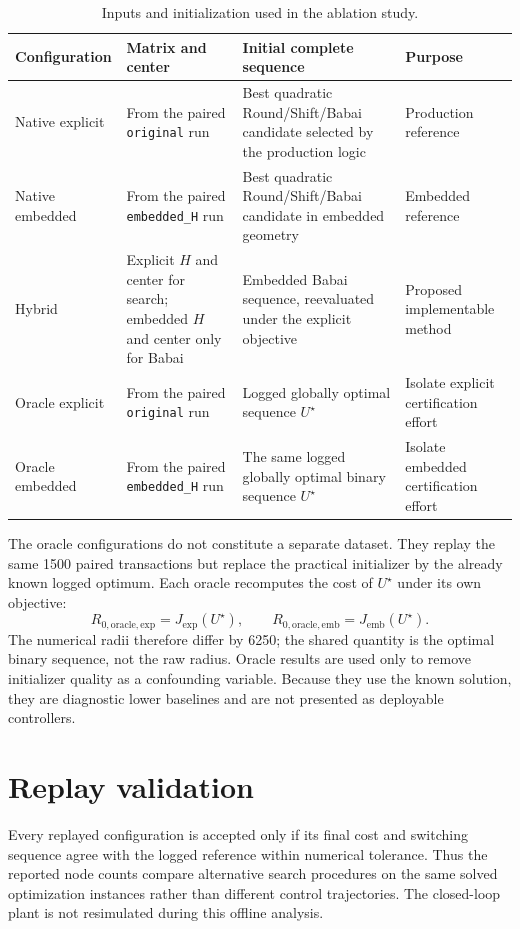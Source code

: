 \documentclass[paper=a4,oneside,fontsize=12pt,DIV=14,headings=normal,parskip=half,headsepline,numbers=noendperiod]{scrreprt}
\begin{document}
\begin{table}[H]
\centering
\caption{Inputs and initialization used in the ablation study.}
\label{tab:configurations}
\begin{tabularx}{\textwidth}{lXXX}
\toprule
Configuration & Matrix and center & Initial complete sequence & Purpose\\
\midrule
Native explicit
& From the paired \texttt{original} run
& Best quadratic Round/Shift/Babai candidate selected by the production logic
& Production reference\\

Native embedded
& From the paired \texttt{embedded\_H} run
& Best quadratic Round/Shift/Babai candidate in embedded geometry
& Embedded reference\\

Hybrid
& Explicit $H$ and center for search; embedded $H$ and center only for Babai
& Embedded Babai sequence, reevaluated under the explicit objective
& Proposed implementable method\\

Oracle explicit
& From the paired \texttt{original} run
& Logged globally optimal sequence $U^\star$
& Isolate explicit certification effort\\

Oracle embedded
& From the paired \texttt{embedded\_H} run
& The same logged globally optimal binary sequence $U^\star$
& Isolate embedded certification effort\\
\bottomrule
\end{tabularx}
\end{table}

The oracle configurations do not constitute a separate dataset.  They replay
the same 1500 paired transactions but replace the practical initializer by the
already known logged optimum.  Each oracle recomputes the cost of $U^\star$
under its own objective:
\begin{equation}
 R_{0,\mathrm{oracle,exp}}=J_{\mathrm{exp}}(U^\star),
 \qquad
 R_{0,\mathrm{oracle,emb}}=J_{\mathrm{emb}}(U^\star).
\end{equation}
The numerical radii therefore differ by 6250; the shared quantity is the
optimal binary sequence, not the raw radius.  Oracle results are used only to
remove initializer quality as a confounding variable.  Because they use the
known solution, they are diagnostic lower baselines and are not presented as
deployable controllers.

\section{Replay validation}
Every replayed configuration is accepted only if its final cost and switching
sequence agree with the logged reference within numerical tolerance.  Thus the
reported node counts compare alternative search procedures on the same solved
optimization instances rather than different control trajectories.  The
closed-loop plant is not resimulated during this offline analysis.
\end{document}
